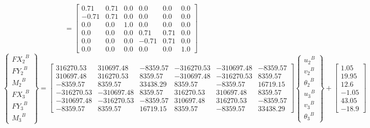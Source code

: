 \documentclass[a4paper]{article}
\begin{document}
{
\renewcommand{\arraystretch}{1.7}
\begin{equation}
[T^*_B]=
\left[\begin{matrix}0.71 & 0.71 & 0.0 & 0.0 & 0.0 & 0.0\\-0.71 & 0.71 & 0.0 & 0.0 & 0.0 & 0.0\\0.0 & 0.0 & 1.0 & 0.0 & 0.0 & 0.0\\0.0 & 0.0 & 0.0 & 0.71 & 0.71 & 0.0\\0.0 & 0.0 & 0.0 & -0.71 & 0.71 & 0.0\\0.0 & 0.0 & 0.0 & 0.0 & 0.0 & 1.0\end{matrix}\right]
\end{equation}
\begin{equation}
\left\{ \begin{array}{c}
{FX_2}^B \\ {FY_2}^B \\ {M_2}^B \\
{FX_3}^B  \\ {FY_3}^B \\ {M_3}^B 
\end{array} \right\} = 
\left[\begin{matrix}316270.53 & 310697.48 & -8359.57 & -316270.53 & -310697.48 & -8359.57\\310697.48 & 316270.53 & 8359.57 & -310697.48 & -316270.53 & 8359.57\\-8359.57 & 8359.57 & 33438.29 & 8359.57 & -8359.57 & 16719.15\\-316270.53 & -310697.48 & 8359.57 & 316270.53 & 310697.48 & 8359.57\\-310697.48 & -316270.53 & -8359.57 & 310697.48 & 316270.53 & -8359.57\\-8359.57 & 8359.57 & 16719.15 & 8359.57 & -8359.57 & 33438.29\end{matrix}\right]
\left\{ \begin{array}{c}
{u_2}^B \\ {v_2}^B \\ {{\theta}_2}^B \\
{u_3}^B  \\ {v_3}^B \\ {{\theta}_3}^B 
\end{array} \right\}+
\begin{bmatrix}1.05\\19.95\\12.6\\-1.05\\43.05\\-18.9\end{bmatrix}
\end{equation}
}
\end{document}
